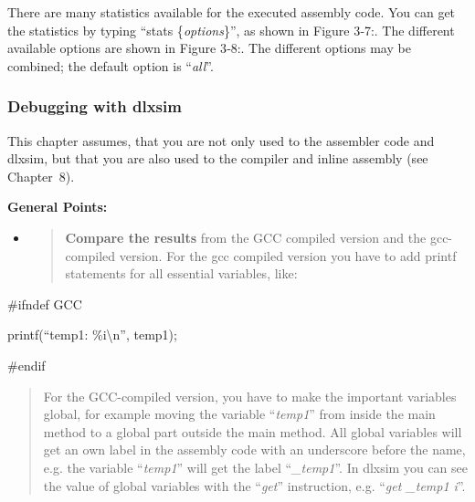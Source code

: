 \documentclass[
]{article}
\begin{document}
There are many statistics available for the executed assembly code. You
can get the statistics by typing ``stats \{\emph{options}\}'', as shown
in Figure 3‑7:. The different available options are shown in Figure
3‑8:. The different options may be combined; the default option is
``\emph{all}''.

\hypertarget{debugging-with-dlxsim}{%
\subsubsection{Debugging with dlxsim}\label{debugging-with-dlxsim}}

This chapter assumes, that you are not only used to the assembler code
and dlxsim, but that you are also used to the compiler and inline
assembly (see Chapter~8).

\textbf{General Points:}

\begin{itemize}
\item
  \begin{quote}
  \textbf{Compare the results} from the GCC compiled version and the
  gcc-compiled version. For the gcc compiled version you have to add
  printf statements for all essential variables, like:
  \end{quote}
\end{itemize}

\#ifndef GCC

printf(``temp1: \%i\textbackslash n'', temp1);

\#endif

\begin{quote}
For the GCC-compiled version, you have to make the important variables
global, for example moving the variable ``\emph{temp1}'' from inside the
main method to a global part outside the main method. All global
variables will get an own label in the assembly code with an underscore
before the name, e.g. the variable ``\emph{temp1}'' will get the label
``\emph{\_temp1}''. In dlxsim you can see the value of global variables
with the ``\emph{get}'' instruction, e.g. ``\emph{get \_temp1 i}''.
\end{quote}
\end{document}
